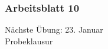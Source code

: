 \documentclass[9pt,german]{beamer}%
\begin{document}
\maketitle%
\addtocounter{framenumber}{-1}%

\begin{frame}
  \frametitle{Arbeitsblatt 10}%
\tableofcontents
\end{frame}



\setcounter{exercise}{35}

\setcounter{exercise}{36}



\begin{frame}
\centering
\Huge{}
\vspace{2cm}

{\LARGE
N\"achste \"Ubung: 23. Januar\\
Probeklausur
}
\end{frame}


\end{document}
